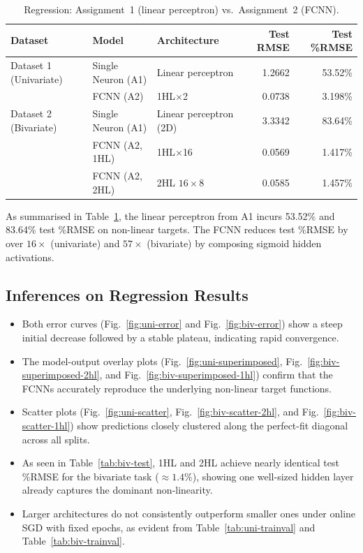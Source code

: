 \documentclass[11pt,a4paper]{article}
\begin{document}
\begin{table}[H]
\centering
\caption{Regression: Assignment~1 (linear perceptron) vs.\ Assignment~2 (FCNN).}
\label{tab:reg-a1-a2}
\begin{tabular}{lllrr}
\toprule
Dataset & Model & Architecture & Test RMSE & Test \%RMSE \\
\midrule
Dataset 1 (Univariate) & Single Neuron (A1) & Linear perceptron & 1.2662 & 53.52\% \\
                        & FCNN (A2) & 1HL$\times$2 & 0.0738 & 3.198\% \\
\midrule
Dataset 2 (Bivariate)  & Single Neuron (A1) & Linear perceptron (2D) & 3.3342 & 83.64\% \\
                        & FCNN (A2, 1HL) & 1HL$\times$16 & 0.0569 & 1.417\% \\
                        & FCNN (A2, 2HL) & 2HL $16\times8$ & 0.0585 & 1.457\% \\
\bottomrule
\end{tabular}
\end{table}

As summarised in Table~\ref{tab:reg-a1-a2}, the linear perceptron from A1 incurs 53.52\% and 83.64\% test \%RMSE on non-linear targets. The FCNN reduces test \%RMSE by over $16\times$ (univariate) and $57\times$ (bivariate) by composing sigmoid hidden activations.

\subsection{Inferences on Regression Results}
\begin{itemize}
    \item Both error curves (Fig.~\ref{fig:uni-error} and Fig.~\ref{fig:biv-error}) show a steep initial decrease followed by a stable plateau, indicating rapid convergence.
    \item The model-output overlay plots (Fig.~\ref{fig:uni-superimposed}, Fig.~\ref{fig:biv-superimposed-2hl}, and Fig.~\ref{fig:biv-superimposed-1hl}) confirm that the FCNNs accurately reproduce the underlying non-linear target functions.
    \item Scatter plots (Fig.~\ref{fig:uni-scatter}, Fig.~\ref{fig:biv-scatter-2hl}, and Fig.~\ref{fig:biv-scatter-1hl}) show predictions closely clustered along the perfect-fit diagonal across all splits.
    \item As seen in Table~\ref{tab:biv-test}, 1HL and 2HL achieve nearly identical test \%RMSE for the bivariate task ($\approx 1.4\%$), showing one well-sized hidden layer already captures the dominant non-linearity.
    \item Larger architectures do not consistently outperform smaller ones under online SGD with fixed epochs, as evident from Table~\ref{tab:uni-trainval} and Table~\ref{tab:biv-trainval}.
\end{itemize}
\end{document}
